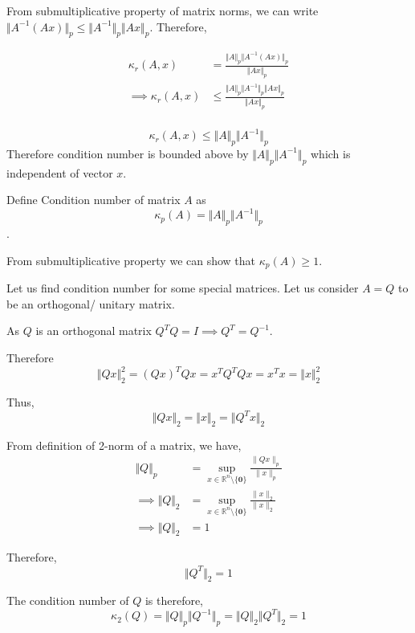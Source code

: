 \documentclass[
]{book}
\begin{document}
From submultiplicative property of matrix norms, we can write \(\Vert A^{-1}(Ax) \Vert_p \le \Vert A^{-1} \Vert_p \Vert Ax \Vert_p\). Therefore,

\begin{align}
\kappa_r(A,x)&= \frac{\Vert A \Vert_p \Vert A^{-1}(Ax) \Vert_p}{\Vert Ax\Vert_p}\\
\implies \kappa_r(A,x)&\le \frac{\Vert A \Vert_p \Vert A^{-1} \Vert_p \Vert Ax \Vert_p}{\Vert Ax\Vert_p}\\
\end{align}

\begin{equation}
\kappa_r(A,x) \le \Vert A \Vert_p \Vert A^{-1} \Vert_p
\end{equation}
Therefore condition number is bounded above by \(\Vert A \Vert_p \Vert A^{-1} \Vert_p\) which is independent of vector \(x\).

Define Condition number of matrix \(A\) as \[\kappa_p(A) = \Vert A \Vert_p \Vert A^{-1} \Vert_p\].

From submultiplicative property we can show that \(\kappa_p(A)\ge 1\).

Let us find condition number for some special matrices. Let us consider \(A=Q\) to be an orthogonal/ unitary matrix.

As \(Q\) is an orthogonal matrix \(Q^TQ = I\implies Q^T = Q^{-1}\).

Therefore \[\Vert Qx \Vert_2^2 = (Qx)^TQx = x^TQ^TQx = x^Tx = \Vert x\Vert_2^2\]

Thus, \[\Vert Qx \Vert_2= \Vert x\Vert_2 = \Vert Q^Tx \Vert_2\]

From definition of 2-norm of a matrix, we have,
\begin{align}
\Vert Q\Vert_p &= \sup_{x\in\mathbb{R}^{n}\setminus \{ \mathbf{0} \}} \frac{\lVert Qx \rVert_p}{\lVert x \rVert_p}\\
\implies \Vert Q\Vert_2 &= \sup_{x\in\mathbb{R}^{n}\setminus \{ \mathbf{0} \}} \frac{\lVert x \rVert_2}{\lVert x \rVert_2}\\
\implies \Vert Q\Vert_2 &= 1
\end{align}

Therefore,
\begin{equation}
\Vert Q^T\Vert_2 = 1
\end{equation}

The condition number of \(Q\) is therefore,
\begin{equation}
\kappa_2(Q) = \Vert Q \Vert_p \Vert Q^{-1} \Vert_p = \Vert Q \Vert_2 \Vert Q^T \Vert_2 = 1 
\end{equation}
\end{document}
